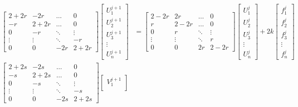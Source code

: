 \begin{align*}
\begin{bmatrix}
    2+2r   & -2r    & \dots  & 0 \\
    -r     & 2+2r   & \dots  & 0 \\
    0      & -r     & \ddots & \vdots \\
    \vdots & \vdots & \ddots & -r   \\
    0      & 0      & -2r    & 2+2r
\end{bmatrix}
\begin{bmatrix}
    U_1^{j+1} \\
    U_2^{j+1} \\
    U_3^{j+1} \\
    \vdots    \\
    U_n^{j+1}
\end{bmatrix}
&=
\begin{bmatrix}
    2-2r   & 2r     & \dots  & 0 \\
    r      & 2-2r   & \dots  & 0 \\
    0      & r      & \ddots & \vdots \\
    \vdots & \vdots & \ddots & r   \\
    0      & 0      & 2r     & 2-2r
\end{bmatrix}
\begin{bmatrix}
    U_1^{j} \\
    U_2^{j} \\
    U_3^{j} \\
    \vdots  \\
    U_n^{j}
\end{bmatrix} + 2k
\begin{bmatrix}
    f_1^{j} \\
    f_2^{j} \\
    f_3^{j} \\
    \vdots  \\
    f_n^{j}
\end{bmatrix} \\[10pt]
\begin{bmatrix}
    2+2s   & -2s    & \dots  & 0 \\
    -s     & 2+2s   & \dots  & 0 \\
    0      & -s     & \ddots & \vdots \\
    \vdots & \vdots & \ddots & -s   \\
    0      & 0      & -2s    & 2+2s
\end{bmatrix}
\begin{bmatrix}
    V_1^{j+1} \\

\end{bmatrix}
\end{align*}
